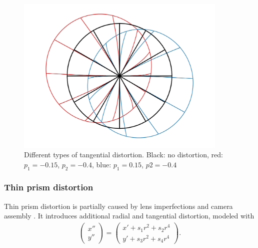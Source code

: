 \begin{figure}[ht]
	\centering
	\includegraphics[width=0.9\textwidth]{2-theory/distortion/tangential.png}
	\caption{Different types of tangential distortion. Black: no distortion, red: $p_1 = -0.15$, $p_2=-0.4$, blue: $p_1 = 0.15$, $p2=-0.4$\label{theory:tangential}}
\end{figure} 

\subsubsection{Thin prism distortion}
Thin prism distortion is partially caused by lens imperfections and camera assembly \cite{weng}.
It introduces additional radial and tangential distortion, modeled with
\begin{align}
\begin{pmatrix}
x''\\
y''
\end{pmatrix}=
\begin{pmatrix}
x' + s_1 r^2 + s_2 r^4\\
y' + s_3 r^2 + s_4 r^4
\end{pmatrix}\label{theory:prismdist}.
\end{align}

